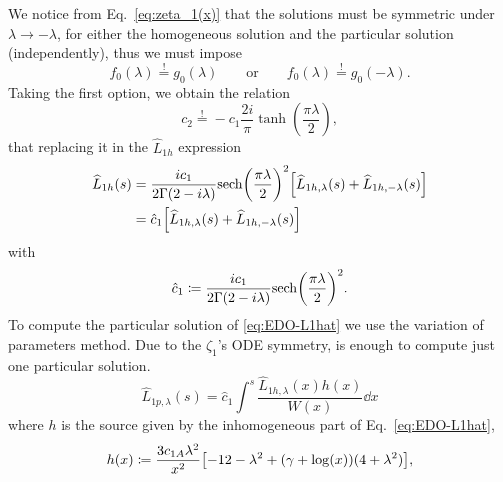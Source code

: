 \documentclass[%
 aip,
 jmp,%
 amsmath,amssymb,
 reprint,%
]{revtex4-2}
\begin{document}
We notice from Eq.~\eqref{eq:zeta_1(x)} that the solutions must be symmetric under $\lambda \to -\lambda$, for either the homogeneous solution and the particular solution (independently), thus we must impose
\begin{equation}
    f_0(\lambda) \stackrel{!}{=} g_0(\lambda)\qquad \text{or} \qquad f_0(\lambda) \stackrel{!}{=} g_0(-\lambda).
\end{equation}
Taking the first option, we obtain the relation
\begin{equation}
    c_2 \stackrel{!}{=} -c_1\frac{2i}{\pi}\tanh(\frac{\pi\lambda}{2}),
\end{equation}
that replacing it in the $\widehat{L}_{1h}$ expression
\begin{equation}
\begin{aligned}
    \widehat{L}_{1h}(s) &= \frac{ic_1}{2\Gamma(2-i\lambda)}{\sech(\frac{\pi\lambda}{2})}^2\qty[\widehat{L}_{1h,\lambda}(s) + \widehat{L}_{1h,-\lambda}(s)]\\
    &= \hat{c}_1\qty[\widehat{L}_{1h,\lambda}(s) + \widehat{L}_{1h,-\lambda}(s)]
\end{aligned}
\end{equation}
with
\begin{equation}
    \hat{c}_1 \coloneq \frac{ic_1}{2\Gamma(2-i\lambda)}{\sech(\frac{\pi\lambda}{2})}^2.
\end{equation}
To compute the particular solution of \eqref{eq:EDO-L1hat} we use the variation of parameters method. Due to the $\zeta_1$'s ODE symmetry, is enough to compute just one particular solution.
\begin{equation}\label{eq:formula-variation-parameters-L1hat}
    \widehat{L}_{1p,\lambda}(s) = \hat{c}_1\int^s\frac{\widehat{L}_{1h,\lambda}(x)h(x)}{W(x)}\dd{x}
\end{equation}
where $h$ is the source given by the inhomogeneous part of Eq.~\eqref{eq:EDO-L1hat},
\begin{equation}
    h(x) \coloneq \frac{3c_{1A}\lambda^2}{x^2}\qty[-12 - \lambda^2 + \qty(\gamma + \log(x))(4 + \lambda^2)],
\end{equation}
\end{document}
